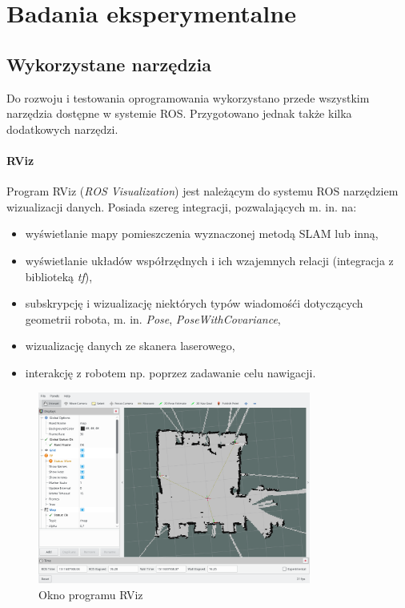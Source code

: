 \chapter{Badania eksperymentalne} 
\label{ch:testy}



\section{Wykorzystane narzędzia}
Do rozwoju i testowania oprogramowania wykorzystano przede wszystkim narzędzia dostępne w systemie ROS. Przygotowano jednak także kilka dodatkowych narzędzi.

\subsubsection{RViz}
Program RViz (\textit{ROS Visualization}) jest należącym do systemu ROS narzędziem wizualizacji danych. Posiada szereg integracji, pozwalających m. in. na:
\begin{itemize}
 \item wyświetlanie mapy pomieszczenia wyznaczonej metodą SLAM lub inną,
 \item wyświetlanie układów współrzędnych i ich wzajemnych relacji (integracja z biblioteką \textit{tf}),
 \item subskrypcję i wizualizację niektórych typów wiadomośći dotyczących geometrii robota, m. in. \textit{Pose}, \textit{PoseWithCovariance},
 \item wizualizację danych ze skanera laserowego,
 \item interakcję z robotem np. poprzez zadawanie celu nawigacji.
\end{itemize}

\begin{figure}[H]
\centering
\includegraphics[width=0.8\textwidth]{img/rviz.png}
\caption{Okno programu RViz}
\label{fig:rviz}
\end{figure}

